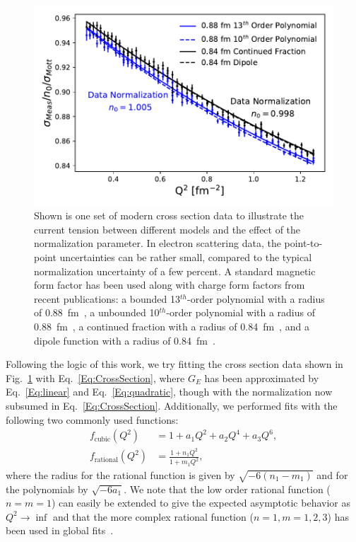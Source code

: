 \documentclass[10pt,aps,prc,twocolumn]{revtex4-1}
\begin{document}
\begin{figure}
\includegraphics[width=\columnwidth]{Figure/RealData.pdf} 
\caption{Shown is one set of modern cross section data to illustrate the current tension between 
different models and the effect of the normalization parameter.   In electron scattering data, the
point-to-point uncertainties can be rather small, compared to the typical normalization uncertainty
of a few percent.   A standard magnetic
form factor has been used along with charge form factors from recent publications:  a bounded
13$^{th}$-order polynomial with a radius of 0.88~fm~\cite{Ye:2017gyb}, a unbounded 10$^{th}$-order polynomial with a radius of 0.88~fm~\cite{Bernauer:2013tpr}, 
a continued fraction with a radius of 0.84~fm~\cite{Griffioen:2015hta}, and a dipole function with a radius of 0.84~fm~\cite{Higinbotham:2015rja}. }
\label{RealData}
\end{figure}

Following the logic of this work, we try fitting the cross section data shown in Fig.~\ref{RealData} with  Eq.~\ref{Eq:CrossSection}, where
$G_E$ has been approximated by Eq.~\ref{Eq:linear} and Eq.~\ref{Eq:quadratic}, though with the normalization now subsumed in Eq.~\ref{Eq:CrossSection}.    
Additionally, we performed fits with the following two commonly used functions:
\begin{align}
f_{\mathrm{cubic}}(Q^2)   & = 1 + a_1 Q^2 + a_2 Q^4 + a_3 Q^6,  \\
f_{\mathrm{rational}}(Q^2) & = \frac{1+n_1 Q^2}{1+m_1 Q^2},
\end{align}
where the radius for the rational function is given by $\sqrt{-6 (n_1 - m_1)}$ and for the polynomials by $\sqrt{-6 a_1}$.
We note that the low order rational function ($n=m=1$) can easily be extended to give the expected asymptotic behavior
as $Q^2 \to \inf$ and that the more complex rational function ($n=1,m=1,2,3$) has been used in global fits~\cite{
Kelly:2004hm,
Puckett:2017flj,   
Gutsche:2017lyu}.
\end{document}
